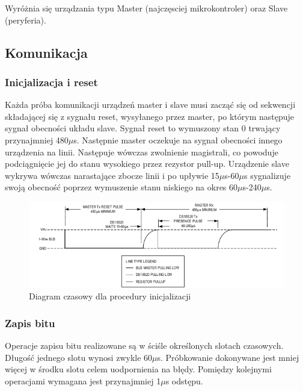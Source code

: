 \documentclass[a4paper]{article}
\begin{document}
Wyróżnia się urządzania typu Master (najczęsciej mikrokontroler) oraz Slave (peryferia).

\subsection{Komunikacja}

\subsubsection{Inicjalizacja i reset}

Każda próba komunikacji urządzeń master i slave musi zacząć się od sekwencji składającej się z sygnału reset, wysyłanego przez master, po którym następuje sygnał obecności układu slave. Sygnał reset to wymuszony stan 0 trwający przynajmniej 480$\mu$s. Następnie master oczekuje na sygnał obecności innego urządzenia na linii. Następuje wówczas zwolnienie magistrali, co powoduje podciągnięcie jej do stanu wysokiego przez rezystor pull-up. Urządzenie slave wykrywa wówczas narastające zbocze linii i po upływie 15$\mu$s-60$\mu$s sygnalizuje swoją obecność poprzez wymuszenie stanu niskiego na okres 60$\mu$s-240$\mu$s.

\begin{figure}[H]
\begin{center}
\includegraphics[scale=0.4]{graphics/init.png}
\end{center}
\caption{Diagram czasowy dla procedury inicjalizacji}
\label{inititming}
\end{figure}

\subsubsection{Zapis bitu}
Operacje zapisu bitu realizowane są w ściśle określonych slotach czasowych. Długość jednego slotu wynosi zwykle 60$\mu$s. Próbkowanie dokonywane jest mniej więcej w środku slotu celem uodpornienia na błędy. Pomiędzy kolejnymi operacjami wymagana jest przynajmniej 1$\mu$s odstępu.
\end{document}
